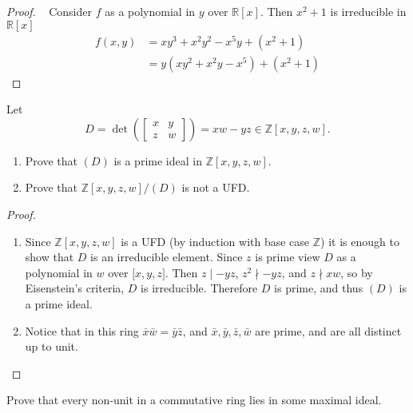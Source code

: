 \documentclass{article}
\newenvironment{problem}[2][Problem]{\begin{trivlist}
\item[\hskip \labelsep {\bfseries #1}\hskip \labelsep {\bfseries #2.}]}{\end{trivlist}}
\newcommand{\paren}[1]{\left( #1 \right)}
\begin{document}
\begin{proof} ~
  Consider $f$ as a polynomial in $y$ over $\mathbb R[x]$. Then $x^2 + 1$ is
  irreducible in $\mathbb R[x]$ \begin{align*}
    f(x, y) &= xy^3 + x^2y^2 - x^5y + (x^2 + 1) \\
    &= y(xy^2 + x^2y - x^5) + (x^2 + 1)
  \end{align*}
\end{proof}
\pagebreak
\begin{problem}{5.24}
  Let \[
    D = \det\!\paren{\begin{bmatrix}x & y \\ z & w\end{bmatrix}} = xw - yz \in \mathbb Z[x,y,z,w].
  \]
  \begin{enumerate}
    \item Prove that $(D)$ is a prime ideal in $\mathbb Z[x,y,z,w]$.
    \item Prove that $\mathbb Z[x,y,z,w]/(D)$ is not a UFD.
  \end{enumerate}
\end{problem}

\begin{proof} ~
  \begin{enumerate}
    \item Since $\mathbb Z[x,y,z,w]$ is a UFD (by induction with base case
    $\mathbb Z$) it is enough to show that $D$ is an irreducible element.
    Since $z$ is prime view $D$ as a polynomial in $w$ over $\mathbb[x,y,z]$.
    Then $z \mid -yz$, $z^2 \nmid -yz$, and $z \nmid xw$, so by Eisenstein's
    criteria, $D$ is irreducible. Therefore $D$ is prime, and thus $(D)$ is a
    prime ideal.
    \item Notice that in this ring $\bar x \bar w = \bar y \bar z$, and
    $\bar x, \bar y, \bar z, \bar w$ are prime, and are all distinct up to unit.
  \end{enumerate}
\end{proof}
\pagebreak
\begin{problem}{5.40}
  Prove that every non-unit in a commutative ring lies in some maximal ideal.
\end{problem}
\end{document}
